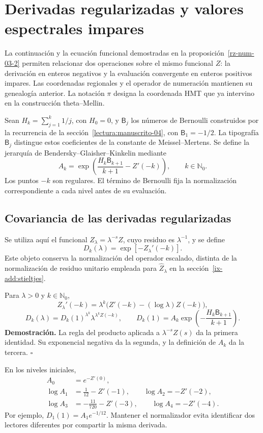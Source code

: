 \section{Derivadas regularizadas y valores espectrales impares}
\label{ix-add:bendersky}

La continuación y la ecuación funcional demostradas en la
proposición~\ref{rz-num-03-2} permiten relacionar dos operaciones
sobre el mismo funcional $Z$: la derivación en enteros negativos y la
evaluación convergente en enteros positivos impares. Las coordenadas
regionales y el operador de numeración mantienen su genealogía anterior.
La notación $\pi$ designa la coordenada HMT que ya intervino en la
construcción theta--Mellin.

Sean $H_k=\sum_{j=1}^k1/j$, con $H_0=0$, y $\mathsf B_j$ los
números de Bernoulli construidos por la recurrencia de la
sección~\ref{lectura:manuscrito-04}, con $\mathsf B_1=-1/2$.
La tipografía $\mathsf B_j$ distingue estos coeficientes de la constante
de Meissel--Mertens. Se define la jerarquía de Bendersky--Glaisher--Kinkelin
mediante
\[
 A_k=\exp\!\left(\frac{H_k\mathsf B_{k+1}}{k+1}-Z'(-k)\right),
 \qquad k\in\mathbb N_0.
\]
Los puntos $-k$ son regulares. El término de Bernoulli fija la
normalización correspondiente a cada nivel antes de su evaluación.

\subsection{Covariancia de las derivadas regularizadas}
Se utiliza aquí el funcional $Z_\lambda=\lambda^{-s}Z$, cuyo residuo
es $\lambda^{-1}$, y se define
\[
 D_k(\lambda)=\exp[-Z_\lambda'(-k)].
\]
Este objeto conserva la normalización del operador escalado, distinta
de la normalización de residuo unitario empleada para
$\widehat Z_\lambda$ en la sección~\ref{ix-add:stieltjes}.

Para $\lambda>0$ y $k\in\mathbb N_0$,
\[
 Z_\lambda'(-k)=\lambda^k
       \bigl(Z'(-k)-(\log\lambda)Z(-k)\bigr),
\]
\[
 D_k(\lambda)=D_k(1)^{\lambda^k}
               \lambda^{\lambda^k Z(-k)},\qquad
 D_k(1)=A_k\exp\!\left(-\frac{H_k\mathsf B_{k+1}}{k+1}\right).
\]
\textbf{Demostración.} La regla del producto aplicada a
$\lambda^{-s}Z(s)$ da la primera identidad. Su exponencial negativa
da la segunda, y la definición de $A_k$ da la tercera.
\hfill$\square$

En los niveles iniciales,
\[
\begin{aligned}
 A_0&=e^{-Z'(0)},\\
 \log A_1&=\frac1{12}-Z'(-1),\qquad \log A_2=-Z'(-2),\\
 \log A_3&=-\frac{11}{720}-Z'(-3),\qquad \log A_4=-Z'(-4).
\end{aligned}
\]
Por ejemplo, $D_1(1)=A_1e^{-1/12}$. Mantener el normalizador evita
identificar dos lectores diferentes por compartir la misma derivada.

